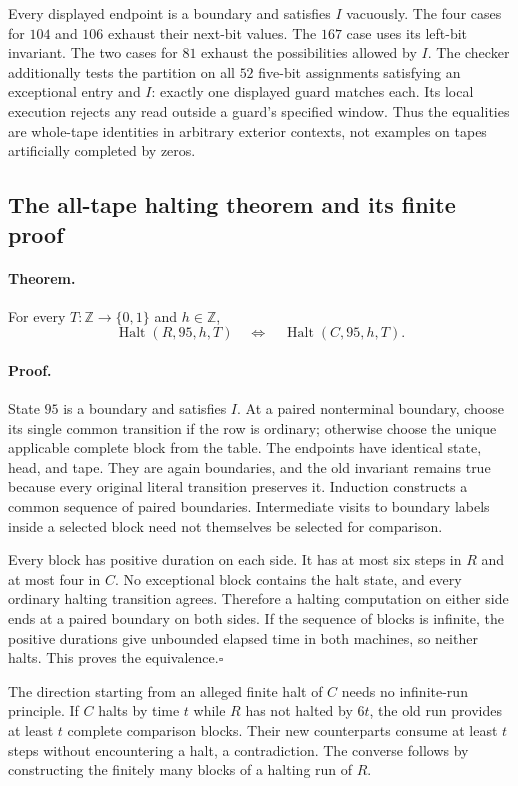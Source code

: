 Every displayed endpoint is a boundary and satisfies $I$ vacuously.
The four cases for $104$ and $106$ exhaust their next-bit values.
The $167$ case uses its left-bit invariant.  The two cases for $81$
exhaust the possibilities allowed by $I$.  The checker additionally
tests the partition on all $52$ five-bit assignments satisfying an
exceptional entry and $I$: exactly one displayed guard matches each.
Its local execution rejects any read outside a guard's specified
window.  Thus the equalities are whole-tape identities in arbitrary
exterior contexts, not examples on tapes artificially completed by zeros.

\subsection{The all-tape halting theorem and its finite proof}

\paragraph{Theorem.}
For every $T:\mathbb Z\to\{0,1\}$ and $h\in\mathbb Z$,
\[
 \operatorname{Halt}(R,95,h,T)
 \quad\Longleftrightarrow\quad
 \operatorname{Halt}(C,95,h,T).
\]

\paragraph{Proof.}
State $95$ is a boundary and satisfies $I$.  At a paired nonterminal
boundary, choose its single common transition if the row is ordinary;
otherwise choose the unique applicable complete block from the table.
The endpoints have identical state, head, and tape.  They are again
boundaries, and the old invariant remains true because every original
literal transition preserves it.  Induction constructs a common
sequence of paired boundaries.  Intermediate visits to boundary labels
inside a selected block need not themselves be selected for comparison.

Every block has positive duration on each side.  It has at most six
steps in $R$ and at most four in $C$.  No exceptional block contains the
halt state, and every ordinary halting transition agrees.  Therefore a
halting computation on either side ends at a paired boundary on both
sides.  If the sequence of blocks is infinite, the positive durations
give unbounded elapsed time in both machines, so neither halts.
This proves the equivalence.\hfill$\square$

The direction starting from an alleged finite halt of $C$ needs no
infinite-run principle.  If $C$ halts by time $t$ while $R$ has not halted
by $6t$, the old run provides at least $t$ complete comparison blocks.
Their new counterparts consume at least $t$ steps without encountering
a halt, a contradiction.  The converse follows by constructing the
finitely many blocks of a halting run of $R$.

